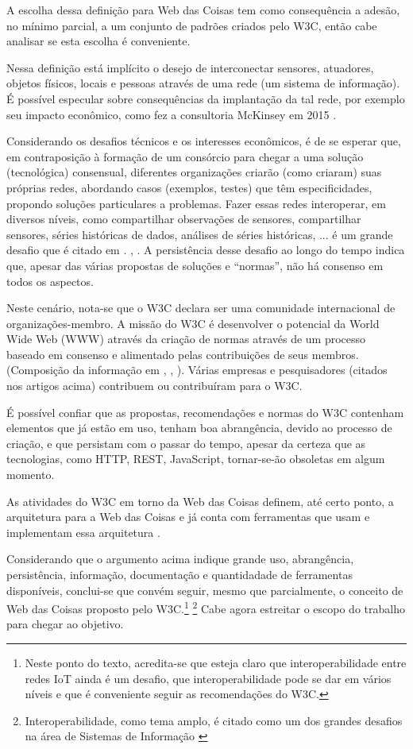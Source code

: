 A escolha dessa definição para Web das Coisas tem como consequência a adesão, no mínimo parcial, a um conjunto de padrões criados pelo W3C, então cabe analisar se esta escolha é conveniente.

Nessa definição está implícito o desejo de interconectar sensores, atuadores, objetos físicos, locais e pessoas através de uma rede (um sistema de informação). É possível especular sobre consequências da implantação da tal rede, por exemplo seu impacto econômico, como fez a consultoria McKinsey em 2015 \cite{manyika2015}. 

Considerando os desafios técnicos e os interesses econômicos, é de se esperar que, em contraposição à formação de um consórcio para chegar a uma solução (tecnológica) consensual, diferentes organizações criarão (como criaram) suas próprias redes, abordando casos (exemplos, testes) que têm especificidades, propondo soluções particulares a problemas. Fazer essas redes interoperar, em diversos níveis, como compartilhar observações de sensores, compartilhar sensores, séries históricas de dados, análises de séries históricas, ... é um grande desafio que é citado em \cite{Stirbu2008} \cite{Gyrard2017}. \cite{GARCIAMANGAS2019235}, \cite{OpenApíWoT2021}. A persistência desse desafio ao longo do tempo indica que, apesar das várias propostas de soluções e ``normas'', não há consenso em todos os aspectos.

Neste cenário, nota-se que o W3C declara ser uma comunidade internacional de organizações-membro. A missão do W3C é desenvolver o potencial da World Wide Web (WWW) através da criação de normas através de um processo baseado em consenso e alimentado pelas contribuições de seus membros. (Composição da informação em \cite{W3CAbout}, \cite{W3CFacts}, \cite{W3CMission}). Várias empresas e pesquisadores (citados nos artigos acima) contribuem ou contribuíram para o W3C.

É possível confiar que as propostas, recomendações e normas do W3C contenham elementos que já estão em uso, tenham boa abrangência, devido ao processo de criação, e que persistam com o passar do tempo, apesar da certeza que as tecnologias, como HTTP, REST, JavaScript, tornar-se-ão obsoletas em algum momento. 

As atividades do W3C em torno da Web das Coisas definem, até certo ponto, a arquitetura para a Web das Coisas  \cite{Matsukura:23:WTA} e já conta com ferramentas que usam e implementam essa arquitetura \cite{WoTDevTools}.

Considerando que o argumento acima indique grande uso, abrangência, persistência, informação, documentação e quantidadade de ferramentas disponíveis, conclui-se que convém seguir, mesmo que parcialmente, o conceito de Web das Coisas proposto pelo W3C.\footnote{Neste ponto do texto, acredita-se que esteja claro que interoperabilidade entre redes IoT ainda é um desafio, que interoperabilidade pode se dar em vários níveis e que é conveniente seguir as recomendações do W3C.}
\footnote{Interoperabilidade, como tema amplo, é citado como um dos grandes desafios na área de Sistemas de Informação \cite{grandsi}} Cabe agora estreitar o escopo do trabalho para chegar ao objetivo.

